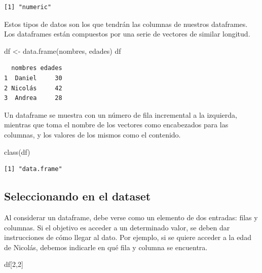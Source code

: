 \documentclass[
  letterpaper,
  DIV=11,
  numbers=noendperiod]{scrreprt}
\newenvironment{Shaded}{\begin{snugshade}}{\end{snugshade}}
\newcommand{\DecValTok}[1]{\textcolor[rgb]{0.68,0.00,0.00}{#1}}
\newcommand{\FunctionTok}[1]{\textcolor[rgb]{0.28,0.35,0.67}{#1}}
\newcommand{\NormalTok}[1]{\textcolor[rgb]{0.00,0.23,0.31}{#1}}
\newcommand{\OtherTok}[1]{\textcolor[rgb]{0.00,0.23,0.31}{#1}}
\begin{document}
\begin{verbatim}
[1] "numeric"
\end{verbatim}

Estos tipos de datos son los que tendrán las columnas de nuestros
dataframes. Los dataframes están compuestos por una serie de vectores de
similar longitud.

\begin{Shaded}
\begin{Highlighting}[]
\NormalTok{df }\OtherTok{\textless{}{-}} \FunctionTok{data.frame}\NormalTok{(nombres, edades)}
\NormalTok{df}
\end{Highlighting}
\end{Shaded}

\begin{verbatim}
  nombres edades
1  Daniel     30
2 Nicolás     42
3  Andrea     28
\end{verbatim}

Un dataframe se muestra con un número de fila incremental a la
izquierda, mientras que toma el nombre de los vectores como encabezados
para las columnas, y los valores de los mismos como el contenido.

\begin{Shaded}
\begin{Highlighting}[]
\FunctionTok{class}\NormalTok{(df)}
\end{Highlighting}
\end{Shaded}

\begin{verbatim}
[1] "data.frame"
\end{verbatim}

\hypertarget{seleccionando-en-el-dataset}{%
\subsection{Seleccionando en el
dataset}\label{seleccionando-en-el-dataset}}

Al considerar un dataframe, debe verse como un elemento de dos entradas:
filas y columnas. Si el objetivo es acceder a un determinado valor, se
deben dar instrucciones de cómo llegar al dato. Por ejemplo, si se
quiere acceder a la edad de Nicolás, debemos indicarle en qué fila y
columna se encuentra.

\begin{Shaded}
\begin{Highlighting}[]
\NormalTok{df[}\DecValTok{2}\NormalTok{,}\DecValTok{2}\NormalTok{]}
\end{Highlighting}
\end{Shaded}
\end{document}

